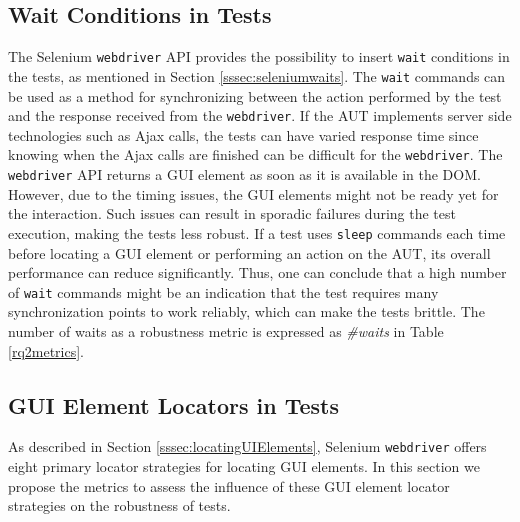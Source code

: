 \subsection{Wait Conditions in Tests}
\label{selenium-waits-metric}
The Selenium \texttt{webdriver} API provides the possibility to insert \texttt{wait} conditions in the tests, as mentioned in Section \ref{sssec:seleniumwaits}. The \texttt{wait} commands can be used as a method for synchronizing between the action performed by the test and the response received from the \texttt{webdriver}. If the AUT implements server side technologies such as Ajax calls, the tests can have varied response time since knowing when the Ajax calls are finished can be difficult for the \texttt{webdriver}. The \texttt{webdriver} API returns a GUI element as soon as it is available in the DOM. However, due to the timing issues, the GUI elements might not be ready yet for the interaction. Such issues can result in sporadic failures during the test execution, making the tests less robust. If a test uses \texttt{sleep} commands each time before locating a GUI element or performing an action on the AUT, its overall performance can reduce significantly. Thus, one can conclude that a high number of \texttt{wait} commands might be an indication that the test requires many synchronization points to work reliably, which can make the tests brittle. The number of waits as a robustness metric is expressed as \textit{\#waits} in Table \ref{rq2metrics}.

\subsection{GUI Element Locators in Tests}
As described in Section \ref{sssec:locatingUIElements}, Selenium \texttt{webdriver} offers eight primary locator strategies for locating GUI elements. In this section we propose the metrics to assess the influence of these GUI element locator strategies on the robustness of tests.

